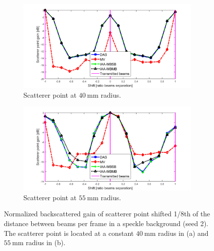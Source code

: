 \begin{figure}[ht]
    \centering
    \begin{subfigure}[t]{\linewidth}
        \includegraphics[width=\linewidth]{./images/results/1/loss_vs_shift_40mm_speckle.png}
        \caption{Scatterer point at $40~$mm radius.}
    \end{subfigure}
    \quad
    \begin{subfigure}[t]{\linewidth}
        \includegraphics[width=\linewidth]{./images/results/1/loss_vs_shift_55mm_speckle.png}
        \caption{Scatterer point at $55~$mm radius.}
    \end{subfigure}
	\caption[Normalized backscattered gain of scatterer point shifted 1/8th of the distance between beams per frame in a speckle background.]{Normalized backscattered gain of scatterer point shifted 1/8th of the distance between beams per frame in a speckle background (seed 2). The scatterer point is located at a constant $40~$mm radius in (a) and $55~$mm radius in (b).}
	\label{fig:loss_vs_shift_speckle}
\end{figure}

